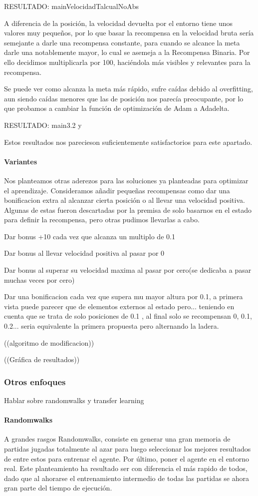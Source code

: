 RESULTADO: mainVelocidadTalcualNoAbs

A diferencia de la posición, la velocidad devuelta por el entorno tiene unos valores muy pequeños, por lo que basar la recompensa en la velocidad bruta sería semejante a darle una recompensa constante, para cuando se alcance la meta darle una notablemente mayor, lo cual se asemeja a la Recompensa Binaria. Por ello decidimos multiplicarla por 100, haciéndola más visibles y relevantes para la recompensa. 

Se puede ver como alcanza la meta más rápido, sufre caídas debido al overfitting, aun siendo caídas menores que las de posición nos parecía preocupante, por lo que probamos a cambiar la función de optimización de Adam a Adadelta.

RESULTADO: main3.2 y  

Estos resultados nos parecieson suficientemente satisfactorios para este apartado.

\paragraph{Variantes}
Nos planteamos otras aderezos para las soluciones ya planteadas para optimizar el aprendizaje. 
Consideramos añadir pequeñas recompensas como dar una bonificacion extra al alcanzar cierta posición o al llevar una velocidad positiva.
Algunas de estas fueron descartadas por la premisa de solo basarnos en el estado para definir la recompensa, pero otras pudimos llevarlas a cabo.

 Dar bonus +10 cada vez que alcanza un multiplo de 0.1

 Dar bonus al llevar velocidad positiva al pasar por 0

 Dar bonus al superar su velocidad maxima al pasar por cero(se dedicaba a pasar muchas veces por cero)

 Dar una bonificacion cada vez que supera mu mayor altura por 0.1, a primera vista puede parecer que de elementos externos al estado pero... teniendo en cuenta que se trata de solo posiciones de 0.1 , al final solo se recompensan 0, 0.1, 0.2... seria equivalente la primera propuesta pero alternando la ladera. 


((algoritmo de modificacion))

((Gráfica de resultados))

\subsubsection*{Otros enfoques}
Hablar sobre randomwalks y transfer learning

\paragraph{Randomwalks}
A grandes rasgos Randomwalks, consiste en generar una gran memoria de partidas jugadas totalmente al azar para luego seleccionar los mejores resultados de entre estos para entrenar el agente. Por último, poner el agente en el entorno real.
Este planteamiento ha resultado ser con diferencia el más rapido de todos, dado que al ahorarse el entrenamiento intermedio de todas las partidas se ahora gran parte del tiempo de ejecución.

